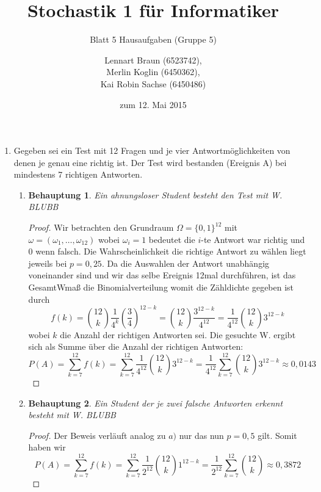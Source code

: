 \documentclass[a4paper]{scrartcl}
\title{Stochastik 1 für Informatiker}
\subtitle{Blatt 5 Hausaufgaben (Gruppe 5)}
\author{
    Lennart Braun (6523742), \\
    Merlin Koglin (6450362), \\
    Kai Robin Sachse (6450486)
}
\date{zum 12. Mai 2015}
\newtheorem*{behaupt}{Behauptung}
\begin{document}
\maketitle

\begin{enumerate}[label=\bfseries\arabic*.]
    \item
        Gegeben sei ein Test mit 12 Fragen und je vier Antwortmöglichkeiten von denen
        je genau eine richtig ist. Der Test wird bestanden (Ereignis A) bei mindestens
        7 richtigen Antworten.
        \begin{enumerate}[label=(\alph*)]
            \item
                \begin{behaupt}
                    Ein ahnungsloser Student besteht den Test mit W. BLUBB
                \end{behaupt}
                \begin{proof}
                    Wir betrachten den Grundraum $\Omega=\{0,1\}^12$ mit
                    $\omega=(\omega_1,\ldots,\omega_12)$ wobei $\omega_i=1$ bedeutet die $i$-te
                    Antwort war richtig und 0 wenn falsch. Die Wahrscheinlichkeit die richtige
                    Antwort zu wählen liegt jeweils bei $p=0,25$. Da die Auswahlen der Antwort
                    unabhängig voneinander sind und wir das selbe Ereignis 12mal durchführen,
                    ist das GesamtWmaß die Binomialverteilung womit die Zähldichte gegeben ist durch
                    \[f(k)=\binom{12}{k} \frac{1}{4^k}\left(\frac{3}{4}\right)^{12-k} = 
                    \binom{12}{k} \frac{3^{12-k}}{4^{12}}= \frac{1}{4^{12}}\binom{12}{k} 3^{12-k}\]
                    wobei $k$ die Anzahl der richtigen Antworten sei. Die gesuchte W. ergibt sich als
                    Summe über die Anzahl der richtigen Antworten:
                    \[P(A)=\sum_{k=7}^{12}f(k)=\sum_{k=7}^{12} \frac{1}{4^{12}}\binom{12}{k} 3^{12-k}=
                     \frac{1}{4^{12}}\sum_{k=7}^{12}\binom{12}{k} 3^{12-k}\approx 0,0143\]
                    
                \end{proof}

            \item
                \begin{behaupt}
                    Ein Student der je zwei falsche Antworten erkennt besteht mit W. BLUBB
                \end{behaupt}
                \begin{proof}
                    Der Beweis verläuft analog zu $a)$ nur das nun $p=0,5$ gilt. Somit haben wir
                    \[P(A)=\sum_{k=7}^{12}f(k)=\sum_{k=7}^{12} \frac{1}{2^{12}}\binom{12}{k} 1^{12-k}=
                     \frac{1}{2^{12}}\sum_{k=7}^{12}\binom{12}{k} \approx 0,3872\]
                \end{proof}


\end{enumerate}
\end{enumerate}
\end{document}
